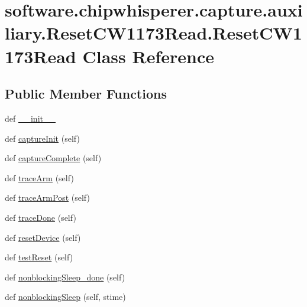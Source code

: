 \hypertarget{classsoftware_1_1chipwhisperer_1_1capture_1_1auxiliary_1_1ResetCW1173Read_1_1ResetCW1173Read}{}\section{software.\+chipwhisperer.\+capture.\+auxiliary.\+Reset\+C\+W1173\+Read.\+Reset\+C\+W1173\+Read Class Reference}
\label{classsoftware_1_1chipwhisperer_1_1capture_1_1auxiliary_1_1ResetCW1173Read_1_1ResetCW1173Read}
\subsection*{Public Member Functions}
\begin{DoxyCompactItemize}
\item 
def \hyperlink{classsoftware_1_1chipwhisperer_1_1capture_1_1auxiliary_1_1ResetCW1173Read_1_1ResetCW1173Read_abb0ea1a542c8b474fe9324ea19085a0a}{\+\_\+\+\_\+init\+\_\+\+\_\+}
\item 
def \hyperlink{classsoftware_1_1chipwhisperer_1_1capture_1_1auxiliary_1_1ResetCW1173Read_1_1ResetCW1173Read_a7995649a5d51334bab48c721745906c5}{capture\+Init} (self)
\item 
def \hyperlink{classsoftware_1_1chipwhisperer_1_1capture_1_1auxiliary_1_1ResetCW1173Read_1_1ResetCW1173Read_a2c5435c952a2fe23d2299fe91c4f37fc}{capture\+Complete} (self)
\item 
def \hyperlink{classsoftware_1_1chipwhisperer_1_1capture_1_1auxiliary_1_1ResetCW1173Read_1_1ResetCW1173Read_aea0cf7bd4ff10d53c0463512cf6617ee}{trace\+Arm} (self)
\item 
def \hyperlink{classsoftware_1_1chipwhisperer_1_1capture_1_1auxiliary_1_1ResetCW1173Read_1_1ResetCW1173Read_a1eaadea176d3b34ccc39b5f890264157}{trace\+Arm\+Post} (self)
\item 
def \hyperlink{classsoftware_1_1chipwhisperer_1_1capture_1_1auxiliary_1_1ResetCW1173Read_1_1ResetCW1173Read_a195813a21181e4690558a19932b36acd}{trace\+Done} (self)
\item 
def \hyperlink{classsoftware_1_1chipwhisperer_1_1capture_1_1auxiliary_1_1ResetCW1173Read_1_1ResetCW1173Read_a05cf57e585058b8c5e961ca25155968f}{reset\+Device} (self)
\item 
def \hyperlink{classsoftware_1_1chipwhisperer_1_1capture_1_1auxiliary_1_1ResetCW1173Read_1_1ResetCW1173Read_a86326b8f28747c5df4025c50be219a14}{test\+Reset} (self)
\item 
def \hyperlink{classsoftware_1_1chipwhisperer_1_1capture_1_1auxiliary_1_1ResetCW1173Read_1_1ResetCW1173Read_a3b6b31c9291cb06898524b255f8c4a1d}{nonblocking\+Sleep\+\_\+done} (self)
\item 
def \hyperlink{classsoftware_1_1chipwhisperer_1_1capture_1_1auxiliary_1_1ResetCW1173Read_1_1ResetCW1173Read_a462a1a7f997d42fe308db27ac2172883}{nonblocking\+Sleep} (self, stime)
\end{DoxyCompactItemize}


